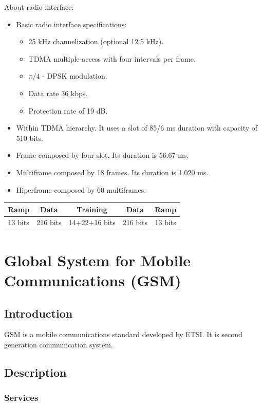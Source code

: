 \documentclass[../main.tex]{subfiles}
\begin{document}
About radio interface:

\begin{itemize}
	\item {
		Basic radio interface specifications:
		\begin{itemize}
			\item 25 kHz channelization (optional 12.5 kHz).
			\item TDMA multiple-access with four intervals per frame.
			\item $\pi/4$ - DPSK modulation.
			\item Data rate 36 kbps.
			\item Protection rate of 19 dB.
		\end{itemize}
	}
	\item Within TDMA hierarchy. It uses a slot of 85/6 ms duration with capacity of 510 bits.
	\item Frame composed by four slot. Its duration is 56.67 ms.
	\item Multiframe composed by 18 frames. Its duration is 1.020 ms.
	\item Hiperframe composed by 60 multiframes.
\end{itemize}

\begin{tabular}{|c|c|c|c|c|}
	\hline
	Ramp	& Data		& Training		& Data		& Ramp \\
	\hline
	13 bits	& 216 bits	& 14+22+16 bits	& 216 bits	& 13 bits \\
	\hline
\end{tabular}

\section{Global System for Mobile Communications (GSM)}

\subsection{Introduction}

GSM is a mobile communications standard developed by ETSI. It is second generation communication system.

\subsection{Description}

\subsubsection{Services}
\end{document}
